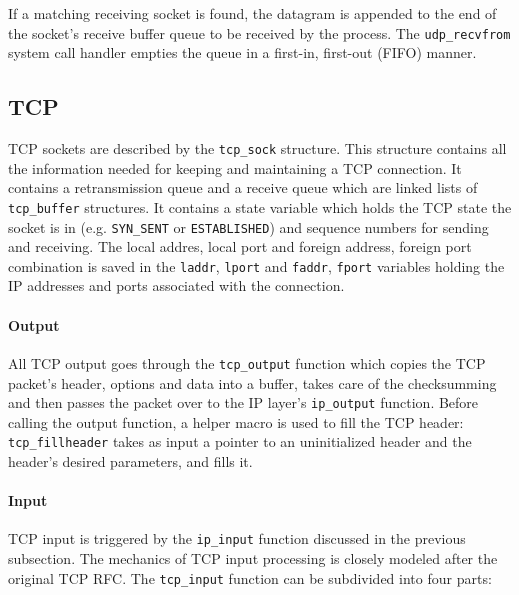 \documentclass[11pt,twoside,abstract,notitlepage]{scrreprt}
\begin{document}
If a matching receiving socket is found, the datagram is appended to the end of the socket's receive buffer queue to be received by the process. The \texttt{udp\_recvfrom} system call handler empties the queue in a first-in, first-out (FIFO) manner. 



\subsection{TCP}
TCP sockets are described by the \texttt{tcp\_sock} structure. This structure contains all the information needed for keeping and maintaining a TCP connection. It contains a retransmission queue and a receive queue which are linked lists of \texttt{tcp\_buffer} structures. It contains a state variable which holds the TCP state the socket is in (e.g. \texttt{SYN\_SENT} or \texttt{ESTABLISHED}) and sequence numbers for sending and receiving. The local addres, local port and foreign address, foreign port combination is saved in the \texttt{laddr}, \texttt{lport} and \texttt{faddr}, \texttt{fport} variables holding the IP addresses and ports associated with the connection. 

\paragraph{Output} All TCP output goes through the \texttt{tcp\_output} function which copies the TCP packet's header, options and data into a buffer, takes care of the checksumming and then passes the packet over to the IP layer's \texttt{ip\_output} function. Before calling the output function, a helper macro is used to fill the TCP header: \texttt{tcp\_fillheader} takes as input a pointer to an uninitialized header and the header's desired parameters, and fills it. 

\paragraph{Input} TCP input is triggered by the \texttt{ip\_input} function discussed in the previous subsection. The mechanics of TCP input processing is closely modeled after the original TCP RFC. The \texttt{tcp\_input} function can be subdivided into four parts: 
\end{document}
